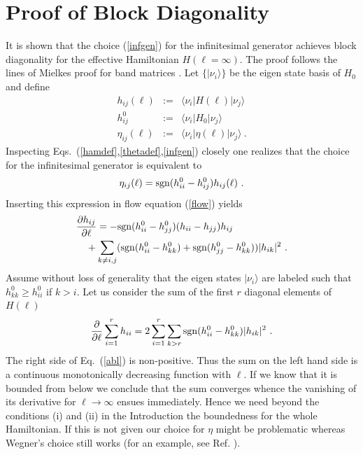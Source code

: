 \section{Proof of Block Diagonality}
\label{app-proof}
It is shown that the choice (\ref{infgen}) for the infinitesimal generator
achieves block diagonality for the effective Hamiltonian $H(\ell=\infty)$.
The proof follows the lines of Mielkes proof for band matrices \cite{mielk98}.
Let $\{|\nu_i\rangle\}$ be the eigen state basis of $H_0$ and define
\begin{eqnarray}
\nonumber
  h_{ij}(\ell)&:=&\langle\nu_i|H(\ell)|\nu_j\rangle\\
\nonumber
  h_{ij}^0&:=&\langle\nu_i|H_0|\nu_j\rangle\\
\nonumber
  \eta_{ij}(\ell)&:=&\langle\nu_i|\eta(\ell)|\nu_j\rangle\ .
\end{eqnarray}
Inspecting Eqs.~(\ref{hamdef},\ref{thetadef},\ref{infgen}) closely
one realizes that the choice for the infinitesimal generator is
equivalent to
\begin{equation}
\label{ku_gen}
\eta_{ij}(\ell)={\rm sgn}(h^0_{ii}-h^0_{ij})h_{ij}(\ell)\ .
\end{equation}
Inserting this expression in flow equation (\ref{flow}) yields
\begin{eqnarray}
  \nonumber
  \lefteqn{\frac{\partial h_{ij}}{\partial \ell} = -{\rm
  sgn}(h^0_{ii}-h^0_{jj})(h_{ii}-h_{jj})h_{ij} }
\\
\label{dia_summ_i}
& &\mbox{} + \sum_{k\neq
  i,j}({\rm sgn}(h^0_{ii}-h^0_{kk})+{\rm
  sgn}(h^0_{jj}-h^0_{kk}))|h_{ik}|^2 \ .
\end{eqnarray}
Assume without loss of generality
 that the eigen states $|\nu_i\rangle$ are labeled such that
$h_{kk}^0\ge h_{ii}^0$ if $k>i$.
Let us consider the sum of the first $r$ diagonal elements of $H(\ell)$
\begin{equation}
\label{abl}
\frac{\partial}{\partial \ell}\sum_{i=1}^r
  h_{ii}=2\sum_{i=1}^r\sum_{k>r}{\rm
  sgn}(h^0_{ii}-h^0_{kk})|h_{ik}|^2 \ .
\end{equation}
The right side of Eq.~(\ref{abl}) is non-positive. 
Thus the sum on the left hand side
is a continuous monotonically decreasing function with $\ell$.
If we know that it is bounded from below we conclude that the sum
converges whence the vanishing  of its derivative for $\ell\to\infty$
ensues immediately. Hence we need beyond the conditions (i) and (ii)
in the Introduction the boundedness for the whole Hamiltonian.
If this is not given our choice for $\eta$ might be problematic
whereas Wegner's choice still works (for an example, see Ref. \cite{creme99}).

